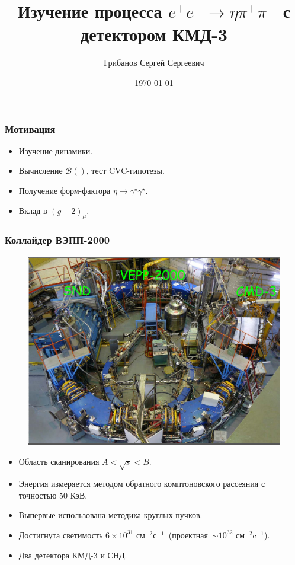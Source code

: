 \documentclass{beamer}
\title[$e^+e^-\rightarrow\eta\pi^+\pi^-$]{Изучение процесса $e^+e^-\to\eta\pi^+\pi^-$ с детектором КМД-3}
\author{Грибанов Сергей Сергеевич}
\date{\today}
\begin{document}
\frame{\titlepage}

\begin{frame}
  \frametitle{Мотивация}
  \begin{itemize}
  \item Изучение динамики.
  \item Вычисление $\mathcal{B}()$, тест CVC-гипотезы.
  \item Получение форм-фактора $\eta\to\gamma^{\star}\gamma^{\star}$.
  \item Вклад в $(g-2)_{\mu}$.
  \end{itemize}
\end{frame}

\begin{frame}
  \frametitle{Коллайдер ВЭПП-2000}
  \begin{minipage}[t]{0.49\linewidth}
    \begin{figure}
      \includegraphics[width=\linewidth]{figures/vepp2k.png}
    \end{figure}
  \end{minipage}
  \begin{minipage}[t]{0.5\linewidth}
    \scriptsize
    \begin{itemize}
    \item Область сканирования $A < \sqrt{s} < B$.
    \item Энергия измеряется методом обратного комптоновского рассеяния с точностью
      $50\text{ КэВ}$.
    \item Выпервые использована методика круглых пучков.
    \item Достигнута светимость
      $6\times{10^{31}}\text{ см}^{-2}\text{с}^{-1}$~(проектная~$\sim{10^{32}}\text{ см}^{-2}\text{c}^{-1}$).
    \item Два детектора КМД-3 и СНД.
    \end{itemize}
  \end{minipage}
\end{frame}
\end{document}

